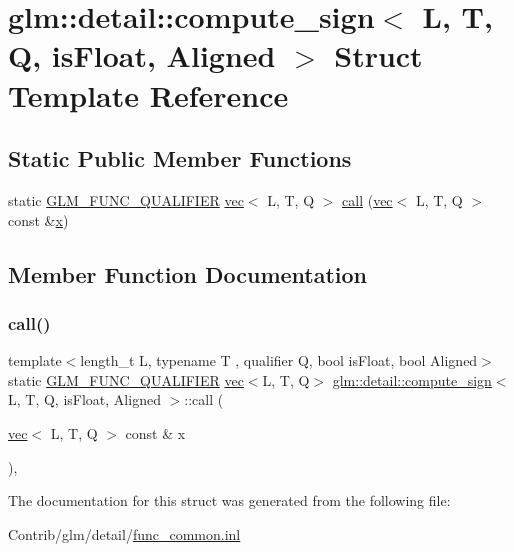 \hypertarget{structglm_1_1detail_1_1compute__sign}{}\section{glm\+:\+:detail\+:\+:compute\+\_\+sign$<$ L, T, Q, is\+Float, Aligned $>$ Struct Template Reference}
\label{structglm_1_1detail_1_1compute__sign}
\subsection*{Static Public Member Functions}
\begin{DoxyCompactItemize}
\item 
static \mbox{\hyperlink{setup_8hpp_a33fdea6f91c5f834105f7415e2a64407}{G\+L\+M\+\_\+\+F\+U\+N\+C\+\_\+\+Q\+U\+A\+L\+I\+F\+I\+ER}} \mbox{\hyperlink{structglm_1_1vec}{vec}}$<$ L, T, Q $>$ \mbox{\hyperlink{structglm_1_1detail_1_1compute__sign_a92a52e249fc740dd128d3b3b09bd0653}{call}} (\mbox{\hyperlink{structglm_1_1vec}{vec}}$<$ L, T, Q $>$ const \&\mbox{\hyperlink{_s_d_l__opengl_8h_ad0e63d0edcdbd3d79554076bf309fd47}{x}})
\end{DoxyCompactItemize}


\subsection{Member Function Documentation}
\mbox{\label{structglm_1_1detail_1_1compute__sign_a92a52e249fc740dd128d3b3b09bd0653}} 
\subsubsection{\texorpdfstring{call()}{call()}}
{\footnotesize\ttfamily template$<$length\+\_\+t L, typename T , qualifier Q, bool is\+Float, bool Aligned$>$ \\
static \mbox{\hyperlink{setup_8hpp_a33fdea6f91c5f834105f7415e2a64407}{G\+L\+M\+\_\+\+F\+U\+N\+C\+\_\+\+Q\+U\+A\+L\+I\+F\+I\+ER}} \mbox{\hyperlink{structglm_1_1vec}{vec}}$<$L, T, Q$>$ \mbox{\hyperlink{structglm_1_1detail_1_1compute__sign}{glm\+::detail\+::compute\+\_\+sign}}$<$ L, T, Q, is\+Float, Aligned $>$\+::call (\begin{DoxyParamCaption}\item[{\mbox{\hyperlink{structglm_1_1vec}{vec}}$<$ L, T, Q $>$ const \&}]{x }\end{DoxyParamCaption})\hspace{0.3cm}{\ttfamily [inline]}, {\ttfamily [static]}}



The documentation for this struct was generated from the following file\+:\begin{DoxyCompactItemize}
\item 
Contrib/glm/detail/\mbox{\hyperlink{func__common_8inl}{func\+\_\+common.\+inl}}\end{DoxyCompactItemize}
